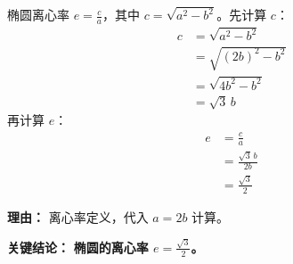 \begin{examplebox}
\begin{description}[style=nextline, leftmargin=2.8em, labelsep=0.5em, itemsep=0.45em]
    \item[\textbf{第四步（求离心率）：}] 椭圆离心率 $e = \frac{c}{a}$，其中 $c = \sqrt{a^2 - b^2}$。先计算 $c$：
    \[
    \begin{aligned}
    c &= \sqrt{a^2 - b^2} \\
    &= \sqrt{(2b)^2 - b^2} \\
    &= \sqrt{4b^2 - b^2} \\
    &= \sqrt{3}\,b
    \end{aligned}
    \]
    再计算 $e$：
    \[
    \begin{aligned}
    e &= \frac{c}{a} \\
    &= \frac{\sqrt{3}\,b}{2b} \\
    &= \frac{\sqrt{3}}{2}
    \end{aligned}
    \]
    \par\textbf{理由：} 离心率定义，代入 $a=2b$ 计算。
\end{description}

\textbf{\textcolor{CExample}{关键结论：}} \textbf{椭圆的离心率 $e = \frac{\sqrt{3}}{2}$。}

\end{examplebox}
